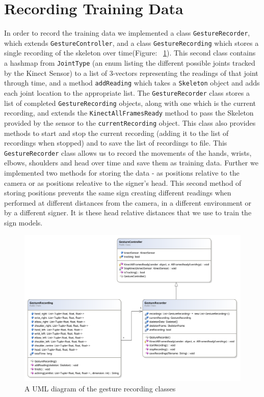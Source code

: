 \section{Recording Training Data}
In order to record the training data we implemented a class \verb|GestureRecorder|, which extends \verb|GestureController|, and a class \verb|GestureRecording| which stores a single recording of the skeleton over time(Figure: ~\ref{fig:umlgest}). This second class contains a hashmap from \verb|JointType| (an enum listing the different possible joints tracked by the Kinect Sensor) to a list of 3-vectors representing the readings of that joint through time, and a method \verb|addReading| which takes a \verb|Skeleton| object and adds each joint location to the appropriate list. The \verb|GestureRecorder| class stores a list of completed \verb|GestureRecording| objects, along with one which is the current recording, and extends the \verb|KinectAllFramesReady| method to pass the Skeleton provided by the sensor to the \verb|currentRecording| object. This class also provides methods to start and stop the current recording (adding it to the list of recordings when stopped) and to save the list of recordings to file. This \verb|GestureRecorder| class allows us to record the movements of the hands, wrists, elbows, shoulders and head over time and save them as training data. Further we implemented two methods for storing the data - as positions relative to the camera or as positions releative to the signer's head. This second method of storing positions prevents the same sign creating different readings when performed at different distances from the camera, in a different environment or by a different signer. It is these head relative distances that we use to train the sign models.


\begin{figure}[h!]
        \centering
        \includegraphics[width = 1.0\textwidth]{ThesisFigs/gestRecDiag}
        \caption{A UML diagram of the gesture recording classes}\label{fig:umlgest}
\end{figure}

